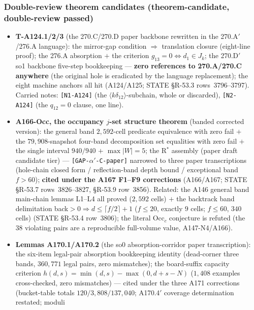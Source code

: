 \subsubsection{Double-review theorem candidates (theorem-candidate,
double-review passed) \tierPCand}\label{subsec:add-dblrev}

\begin{itemize}
\item \textbf{T-A124.1/2/3} (the 270.C/270.D paper backbone rewritten in the
270.A$'$/276.A language): the mirror-gap condition $\Rightarrow$ translation
closure (eight-line proof); the 276.A absorption $+$ the criterion
$g_{13}=0\iff d_1\in J_k$; the 270.D$'$ so1 backbone five-step bookkeeping
--- \textbf{zero references to 270.A/270.C anywhere} (the original hole is
eradicated by the language replacement); the eight machine anchors all hit
(A124/A125; STATE \S R-53.3 rows~3796--3797). Carried notes:
\texttt{[N1-A124]} (the $\langle k\delta_{12}\rangle$-subchain, whole or
discarded), \texttt{[N2-A124]} (the $q_{12}=0$ clause, one line).
\item \textbf{A166-Occ, the occupancy $j$-set structure theorem} (banded
corrected version): the general band $2{,}592$-cell predicate equivalence
with zero fail $+$ the $79{,}908$-snapshot four-band decomposition set
equalities with zero fail $+$ the single interval $940/940$ $+$
$\max\lvert W\rvert=5$; the R$^*$ assembly (paper draft candidate tier) ---
\texttt{[GAP-$\alpha'$-C-paper]} narrowed to three paper transcriptions
(hole-chain closed form / reflection-band depth bound / exceptional band
$f>60$); \textbf{cited under the A167 F1--F9 corrections} (A166/A167; STATE
\S R-53.7 rows~3826--3827, \S R-53.9 row~3856). Related: the A146 general
band main-chain lemmas L1--L4 all proved ($2{,}592$ cells) $+$ the backtrack
band delimitation back$>0\Rightarrow d\le\lceil f/2\rceil+1$ ($f\le20$,
exactly $9$ cells; $f\le60$, $340$ cells) (STATE \S R-53.4 row~3806); the
literal Occ$_c$ conjecture is refuted (the $38$ violating pairs are a
reproducible full-volume value, A147-N4/A166).
\item \textbf{Lemmas A170.1/A170.2} (the so0 absorption-corridor paper
transcription): the six-item legal-pair absorption bookkeeping identity
(dead-corner three bands, $360{,}771$ legal pairs, zero mismatches); the
board-suffix capacity criterion
$h(d,s)=\min(d,s)-\max(0,d+s-N)$ ($1{,}408$ examples cross-checked, zero
mismatches) --- cited under the three A171 corrections (bucket-table totals
$120/3{,}808/137{,}040$; A170.4$'$ coverage determination restated; moduli

\end{itemize}
